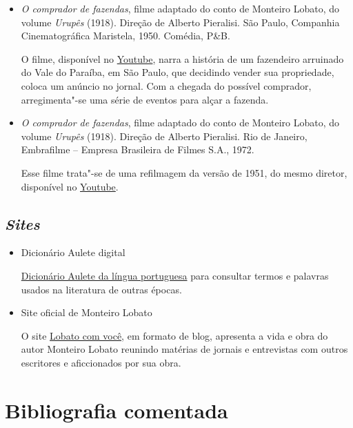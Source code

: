 \documentclass[11pt]{extarticle}
\begin{document}
\begin{itemize}

\item \textit{O comprador de fazendas}, filme adaptado do conto de Monteiro
Lobato, do volume \emph{Urupês} (1918). Direção de Alberto Pieralisi.
São Paulo, Companhia Cinematográfica Maristela, 1950. Comédia, P\&B.

O filme, disponível no \href{https://www.youtube.com/watch?v=LcdfdfD9_Bs}{Youtube}, 
narra a história de um fazendeiro arruinado do Vale do Paraíba, em
São Paulo, que decidindo vender sua propriedade, coloca um anúncio no jornal.
Com a chegada do possível comprador, arregimenta"-se uma série de eventos para 
alçar a fazenda. 

\item  \textit{O comprador de fazendas}, filme adaptado do conto de Monteiro
Lobato, do volume \emph{Urupês} (1918). Direção de Alberto Pieralisi.
Rio de Janeiro, Embrafilme -- Empresa Brasileira de Filmes S.A., 1972.

Esse filme trata"-se de uma refilmagem da versão de 1951, do mesmo 
diretor, disponível no \href{https://www.youtube.com/watch?v=C9OrDOQWm5o}{Youtube}.

\end{itemize}

\subsection{\emph{Sites}}

\begin{itemize}

\item Dicionário Aulete digital

\href{http://www.aulete.com.br/}{Dicionário Aulete da língua portuguesa} para 
consultar termos e palavras usados na literatura de outras épocas.

\item  Site oficial de Monteiro Lobato

O site \href{https://lobato.com.vc//}{Lobato com você}, em formato de 
blog, apresenta a vida e obra do autor Monteiro Lobato 
reunindo matérias de jornais e entrevistas com outros escritores e aficcionados 
por sua obra. 

\end{itemize}

\section{Bibliografia comentada}
\end{document}
